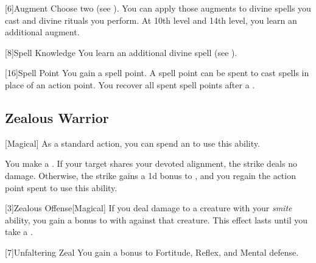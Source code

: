             [6]{Augment}
            Choose two  (see ).
            You can apply those augments to divine spells you cast and divine rituals you perform.
            At 10th level and 14th level, you learn an additional augment.

            [8]{Spell Knowledge}
            You learn an additional divine spell (see ).

            [16]{Spell Point} 
            You gain a spell point.
            A spell point can be spent to cast spells in place of an action point.
            You recover all spent spell points after a .

        \subsection{Zealous Warrior}
            [Magical] As a standard action, you can spend an  to use this ability.
            \begin{ability}
                \begin{spelleffects}
                    \spelleffect You make a .
                    If your target shares your devoted alignment, the strike deals no damage.
                    Otherwise, the strike gains a \plus1d bonus to , and you regain the action point spent to use this ability.
                \end{spelleffects}
            \end{ability}

            [3]{Zealous Offense}[Magical]
            If you deal damage to a creature with your \textit{smite} ability, you gain a  bonus to  with  against that creature.
            This effect lasts until you take a .

            [7]{Unfaltering Zeal}
            You gain a  bonus to Fortitude, Reflex, and Mental defense.

